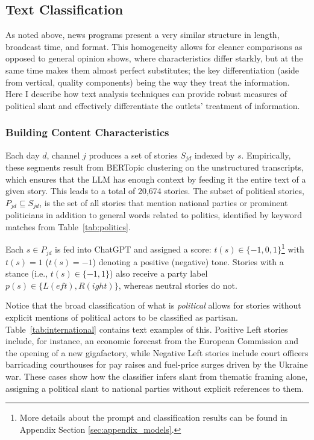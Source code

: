 \documentclass[12pt]{article}
\begin{document}
	
	
	
	\subsection{Text Classification}
	
	As noted above,  news programs present a very similar structure in length, broadcast time, and format. This homogeneity allows for cleaner comparisons as opposed to general opinion shows, where characteristics differ starkly, but at the same time makes them almost perfect substitutes; the key differentiation (aside from vertical, quality components) being the way they treat the information. Here I describe how text analysis techniques can provide robust measures of political slant and effectively differentiate the outlets' treatment of  information. 
	

	
	\subsubsection*{Building Content Characteristics}
	
	Each day \(d\), channel \(j\) produces a set of stories \(S_{jd}\) indexed by \(s\). Empirically, these segments result from BERTopic clustering on the unstructured transcripts, which ensures that the LLM has enough context by feeding it the entire text of a given story. This leads to a total of 20,674 stories. The subset of political stories, \({P}_{jd}\subseteq S_{jd}\), is the set of all stories that mention national parties or prominent politicians in addition to general words related to politics, identified by keyword matches from Table~\ref{tab:politics}.
	
	Each \(s\in {P}_{jd}\) is fed into ChatGPT and  assigned a score: \({t}(s)\in\{-1,0,1\}\)\footnote{More details about the prompt and classification results can be found in Appendix Section \ref{sec:appendix_models}.} with ${t}(s)=1$ (${t}(s)=-1$) denoting a positive (negative) tone. Stories with a stance (i.e., \({t}(s)\in\{-1,1\}\)) also receive a party label \({p}(s)\in\{L(eft),R(ight)\}\), whereas neutral stories do not. 
	
	Notice that the broad classification of what is \emph{political} allows for stories without explicit mentions of  political actors to be classified as partisan. Table~\ref{tab:international} contains text examples of this.  Positive Left stories include, for instance,  an economic forecast from the European Commission and the opening of a new gigafactory, while Negative Left stories include court officers barricading courthouses for pay raises and fuel-price surges driven by the Ukraine war. These cases show how the classifier infers slant from thematic framing alone, assigning a political slant to national parties without explicit references to them. 
	
\end{document}
